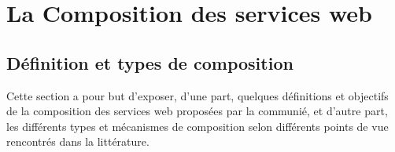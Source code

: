 \chapter{La Composition des services web}

  

  
  

\newpage

  \section{Définition et types de composition}
  \label{sec:defin-et-caract}

  Cette section a pour but d'exposer, d'une part, quelques définitions et objectifs de la composition
  des services web proposées par la communié, et d'autre part, les différents types et mécanismes 
  de composition selon différents points de vue rencontrés dans la littérature.
  
